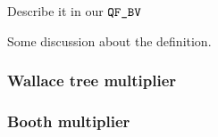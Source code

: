 Describe it in our $\texttt{QF\_BV}$



\begin{df}
  
\end{df}

Some discussion about the definition.

\begin{example}
  
\end{example}


\subsubsection{Wallace tree multiplier}

\subsubsection{Booth multiplier}






